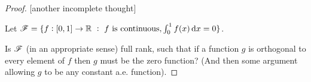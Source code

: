 \begin{proof}

  [another incomplete thought]

  Let $\ms F = \{f: [0, 1] \to \R ~:~ f \text{~is continuous}, \int_0^1 f(x) \dx = 0 \}$.

  Is $\mathscr F$ (in an appropriate sense) full rank, such that if a function $g$ is orthogonal to every element
  of $f$ then $g$ must be the zero function? (And then some argument allowing $g$ to be any constant a.e.
  function).
\end{proof}














